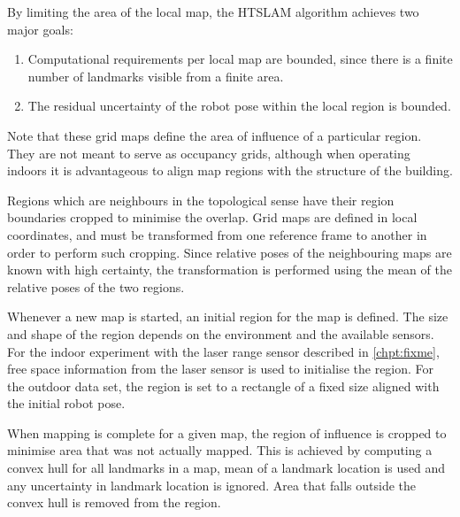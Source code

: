 By limiting the area of the local map, the HTSLAM algorithm achieves
two major goals: 
\begin{enumerate}
\item Computational requirements per local map
are bounded, since there is a finite number of landmarks visible from
a finite area.
\item The residual uncertainty of the robot pose within the local region is bounded.
\end{enumerate}

Note that these grid maps define the area of influence of a particular
region. They are not meant to serve as occupancy grids, although when
operating indoors it is advantageous to align map regions with the
structure of the building.

Regions which are neighbours in the topological sense have their region
boundaries cropped to minimise the overlap. Grid maps
are defined in local coordinates, and must be transformed
from one reference frame to another in order to perform such
cropping. Since relative poses of the neighbouring maps are known with
high certainty, the transformation is performed using the mean of the
relative poses of the two regions.


Whenever a new map is started, an initial region for the map is defined.
The size and shape of the region depends on the environment and the
available sensors. For the indoor experiment with the laser range
sensor described in \ref{chpt:fixme}, free space information from the laser sensor is used to
initialise the region. For the outdoor data set, the region is set to a
rectangle of a fixed size aligned with the initial robot pose.

When mapping is complete for a given map, the region of influence is
cropped to minimise area that was not actually
mapped. This is achieved by computing a convex hull for all landmarks in a map,
mean of a landmark location is used and any uncertainty in landmark
location is ignored. Area that falls outside the convex hull is
removed from the region.



